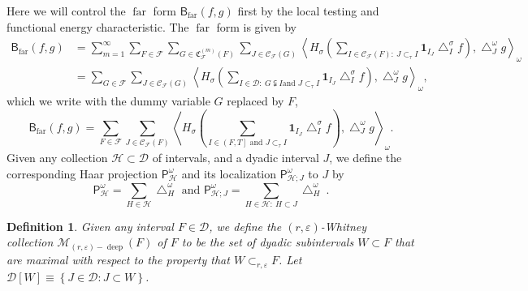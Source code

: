 \documentclass{amsart}%
\theoremstyle{plain}
\newtheorem{definition}[theorem]{Definition}
\numberwithin{equation}{section}
\begin{document}
Here we will control the $\operatorname{far}$ form $\mathsf{B}%
_{\operatorname{far}}\left(  f,g\right)  $ first by the local testing and
functional energy characteristic. The $\operatorname{far}$ form is given by%
\begin{align*}
\mathsf{B}_{\operatorname{far}}\left(  f,g\right)   & =\sum_{m=1}^{\infty}%
\sum_{F\in\mathcal{F}}\sum_{G\in\mathfrak{C}_{\mathcal{F}}^{\left(  m\right)
}\left(  F\right)  }\sum_{J\in\mathcal{C}_{\mathcal{F}}\left(  G\right)
}\left\langle H_{\sigma}\left(  \sum_{I\in\mathcal{C}_{\mathcal{F}}\left(
F\right)  :\ J\subset_{\tau}I}\mathbf{1}_{I_{J}}\bigtriangleup_{I}^{\sigma
}f\right)  ,\bigtriangleup_{J}^{\omega}g\right\rangle _{\omega}\\
& =\sum_{G\in\mathcal{F}}\sum_{J\in\mathcal{C}_{\mathcal{F}}\left(  G\right)
}\left\langle H_{\sigma}\left(  \sum_{I\in\mathcal{D}:\ G\subsetneqq I\text{
and }J\subset_{\tau}I}\mathbf{1}_{I_{J}}\bigtriangleup_{I}^{\sigma}f\right)
,\bigtriangleup_{J}^{\omega}g\right\rangle _{\omega},
\end{align*}
which we write with the dummy variable $G$ replaced by $F$,%
\[
\mathsf{B}_{\operatorname{far}}\left(  f,g\right)  =\sum_{F\in\mathcal{F}}%
\sum_{J\in\mathcal{C}_{\mathcal{F}}\left(  F\right)  }\left\langle H_{\sigma
}\left(  \sum_{I\in\left(  F,T\right]  \text{ and }J\subset_{\tau}I}%
\mathbf{1}_{I_{J}}\bigtriangleup_{I}^{\sigma}f\right)  ,\bigtriangleup
_{J}^{\omega}g\right\rangle _{\omega}.
\]
Given any collection $\mathcal{H}\subset\mathcal{D}$ of intervals, and a
dyadic interval $J$, we define the corresponding Haar projection
$\mathsf{P}_{\mathcal{H}}^{\omega}$ and its localization $\mathsf{P}%
_{\mathcal{H};J}^{\omega}$ to $J$ by%
\begin{equation}
\mathsf{P}_{\mathcal{H}}^{\omega}=\sum_{H\in\mathcal{H}}\bigtriangleup
_{H}^{\omega}\text{ and }\mathsf{P}_{\mathcal{H};J}^{\omega}=\sum
_{H\in\mathcal{H}:\ H\subset J}\bigtriangleup_{H}^{\omega}%
\ .\label{def localization}%
\end{equation}


\begin{definition}
Given any interval $F\in\mathcal{D}$, we define the $\left(  r,\varepsilon
\right)  $\emph{-Whitney} collection $\mathcal{M}_{\left(  r,\varepsilon
\right)  -\operatorname*{deep}}\left(  F\right)  $ of $F$ to be the set of
dyadic subintervals $W\subset F$ that are maximal with respect to the property
that $W\subset_{r,\varepsilon}F$. Let $\mathcal{D}\left[  W\right]
\equiv\left\{  J\in\mathcal{D}:J\subset W\right\}  $.
\end{definition}
\end{document}
